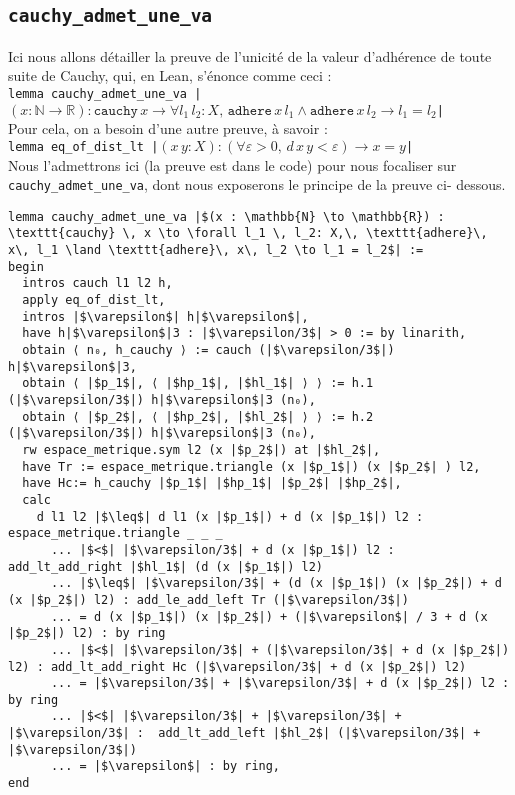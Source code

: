 \subsection{\texttt{cauchy\_admet\_une\_va}}
Ici nous allons détailler la preuve de l'unicité de la valeur d'adhérence de toute suite de Cauchy, qui, en Lean, s'énonce comme ceci : \\
\texttt{lemma cauchy_admet_une_va |$(x : \mathbb{N} \to \mathbb{R}) : \texttt{cauchy} \, x \to \forall l_1 \, l_2: X,\, \texttt{adhere}\, x\, l_1 \land \texttt{adhere}\, x\, l_2 \to l_1 = l_2$|}\\
Pour cela, on a besoin d'une autre preuve, à savoir : \\
\texttt{lemma eq_of_dist_lt |$(x\, y : X) : (\forall \varepsilon > 0,\, d\, x\, y < \varepsilon) \to x = y$| }\\
Nous l'admettrons ici (la preuve est dans le code) pour nous focaliser sur \texttt{cauchy\_admet\_une\_va}, dont nous exposerons le principe de la preuve ci- dessous. 
\begin{verbatim}
lemma cauchy_admet_une_va |$(x : \mathbb{N} \to \mathbb{R}) : \texttt{cauchy} \, x \to \forall l_1 \, l_2: X,\, \texttt{adhere}\, x\, l_1 \land \texttt{adhere}\, x\, l_2 \to l_1 = l_2$| :=
begin
  intros cauch l1 l2 h,
  apply eq_of_dist_lt,
  intros |$\varepsilon$| h|$\varepsilon$|,
  have h|$\varepsilon$|3 : |$\varepsilon/3$| > 0 := by linarith,
  obtain ⟨ n₀, h_cauchy ⟩ := cauch (|$\varepsilon/3$|) h|$\varepsilon$|3,
  obtain ⟨ |$p_1$|, ⟨ |$hp_1$|, |$hl_1$| ⟩ ⟩ := h.1 (|$\varepsilon/3$|) h|$\varepsilon$|3 (n₀),
  obtain ⟨ |$p_2$|, ⟨ |$hp_2$|, |$hl_2$| ⟩ ⟩ := h.2 (|$\varepsilon/3$|) h|$\varepsilon$|3 (n₀),
  rw espace_metrique.sym l2 (x |$p_2$|) at |$hl_2$|,
  have Tr := espace_metrique.triangle (x |$p_1$|) (x |$p_2$| ) l2,
  have Hc:= h_cauchy |$p_1$| |$hp_1$| |$p_2$| |$hp_2$|,
  calc
    d l1 l2 |$\leq$| d l1 (x |$p_1$|) + d (x |$p_1$|) l2 : espace_metrique.triangle _ _ _
      ... |$<$| |$\varepsilon/3$| + d (x |$p_1$|) l2 :  add_lt_add_right |$hl_1$| (d (x |$p_1$|) l2)
      ... |$\leq$| |$\varepsilon/3$| + (d (x |$p_1$|) (x |$p_2$|) + d (x |$p_2$|) l2) : add_le_add_left Tr (|$\varepsilon/3$|)
      ... = d (x |$p_1$|) (x |$p_2$|) + (|$\varepsilon$| / 3 + d (x |$p_2$|) l2) : by ring 
      ... |$<$| |$\varepsilon/3$| + (|$\varepsilon/3$| + d (x |$p_2$|) l2) : add_lt_add_right Hc (|$\varepsilon/3$| + d (x |$p_2$|) l2)
      ... = |$\varepsilon/3$| + |$\varepsilon/3$| + d (x |$p_2$|) l2 : by ring
      ... |$<$| |$\varepsilon/3$| + |$\varepsilon/3$| + |$\varepsilon/3$| :  add_lt_add_left |$hl_2$| (|$\varepsilon/3$| + |$\varepsilon/3$|)
      ... = |$\varepsilon$| : by ring,
end
\end{verbatim}
